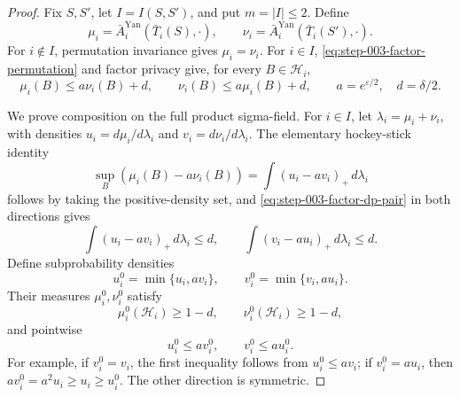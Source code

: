 \begin{proof}
Fix \(S,S'\), let \(I=I(S,S')\), and put \(m=|I|\le2\).  Define
\[
\mu_i=\bar A_i^{\mathrm{Yan}}(\bar T_i(S),\cdot),
\qquad
\nu_i=\bar A_i^{\mathrm{Yan}}(\bar T_i(S'),\cdot).
\]
For \(i\notin I\), permutation invariance gives \(\mu_i=\nu_i\).  For
\(i\in I\), \eqref{eq:step-003-factor-permutation} and factor privacy give,
for every \(B\in\mathscr H_i\),
\begin{equation}\label{eq:step-003-factor-dp-pair}
\mu_i(B)\le a\nu_i(B)+d,\qquad
\nu_i(B)\le a\mu_i(B)+d,\qquad
a=e^{\varepsilon/2},\quad d=\delta/2.
\end{equation}

We prove composition on the full product sigma-field.  For \(i\in I\), let
\(\lambda_i=\mu_i+\nu_i\), with densities
\(u_i=d\mu_i/d\lambda_i\) and \(v_i=d\nu_i/d\lambda_i\).  The elementary
hockey-stick identity
\[
\sup_B(\mu_i(B)-a\nu_i(B))
=\int(u_i-av_i)_+\,d\lambda_i
\]
follows by taking the positive-density set, and
\eqref{eq:step-003-factor-dp-pair} in both directions gives
\begin{equation}\label{eq:step-003-hockey-stick}
\int(u_i-av_i)_+\,d\lambda_i\le d,\qquad
\int(v_i-au_i)_+\,d\lambda_i\le d.
\end{equation}
Define subprobability densities
\begin{equation}\label{eq:step-003-truncated-densities}
u_i^0=\min\{u_i,av_i\},\qquad
v_i^0=\min\{v_i,au_i\}.
\end{equation}
Their measures \(\mu_i^0,\nu_i^0\) satisfy
\begin{equation}\label{eq:step-003-truncated-mass}
\mu_i^0(\mathcal H_i)\ge1-d,\qquad
\nu_i^0(\mathcal H_i)\ge1-d,
\end{equation}
and pointwise
\begin{equation}\label{eq:step-003-mutual-domination}
u_i^0\le av_i^0,\qquad v_i^0\le au_i^0.
\end{equation}
For example, if \(v_i^0=v_i\), the first inequality follows from
\(u_i^0\le av_i\); if \(v_i^0=au_i\), then
\(av_i^0=a^2u_i\ge u_i\ge u_i^0\).  The other direction is symmetric.


\end{proof}
